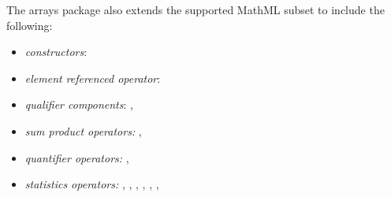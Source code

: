 The arrays package also extends the supported MathML subset to include the following:
\begin{itemize}
\item \emph{constructors}: 
\item \emph{element referenced operator}: 
\item \emph{qualifier components}: ,  
\item \emph{sum product operators:} , 
\item \emph{quantifier operators:} , 
\item \emph{statistics operators:} , , , , , , 
\end{itemize}
